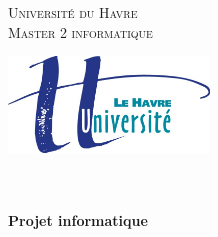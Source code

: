 \makeatletter
  \begin{titlepage}
  
  \begin{minipage}[c]{0.3\textwidth}
    \large \textsc{Université du Havre}\\
  \textsc{Master 2 informatique}
\end{minipage}
\hfill
\begin{minipage}[c]{0.3\textwidth}
	\hspace{3cm}
  \includegraphics[width=0.4\textwidth]{../logo-univ.jpg} 
\end{minipage}

  \begin{center}
 
  \vfill
       {\LARGE \textbf{\@title}} \\
    \vspace{2em}
     {\large\textbf{	\@date\\
     	Projet informatique}}\\
 		\vspace{2em}
 		\vfill
        {\large \@author} \\
  \end{center}
      
  
       
  \end{titlepage}
\makeatother